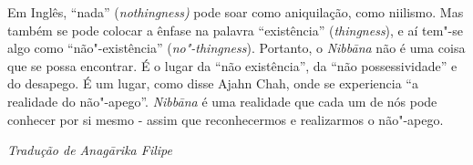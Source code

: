 Em Inglês, ``nada'' (\emph{nothingness)} pode soar como aniquilação,
como niilismo. Mas também se pode colocar a ênfase na palavra
``existência'' (\emph{thingness}), e aí tem"-se algo como
``não"-existência'' (\emph{no"-thingness}). Portanto, o \emph{Nibbāna} não
é uma coisa que se possa encontrar. É o lugar da ``não existência'', da
``não possessividade'' e do desapego. É um lugar, como disse Ajahn Chah,
onde se experiencia ``a realidade do não"-apego''. \emph{Nibbāna} é uma
realidade que cada um de nós pode conhecer por si mesmo - assim que
reconhecermos e realizarmos o não"-apego.


\vfill
{\raggedleft\itshape\small
  Tradução de Anagārika Filipe
\par}
